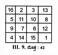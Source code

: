 \begin{figure}[H]
\begin{figure}[H]
\begin{figure}[h]
\begin{figure}[h]
\begin{itemize}
	\begin{figure}[h]
	\includegraphics{src/figures/chap3/fig3-36.jpg}
	\end{figure}


\end{itemize}
\end{figure}
\end{figure}
\end{figure}
\end{figure}
